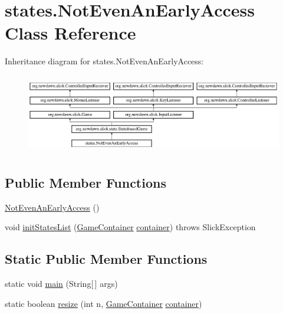 \hypertarget{classstates_1_1_not_even_an_early_access}{}\section{states.\+Not\+Even\+An\+Early\+Access Class Reference}
\label{classstates_1_1_not_even_an_early_access}
Inheritance diagram for states.\+Not\+Even\+An\+Early\+Access\+:\begin{figure}[H]
\begin{center}
\leavevmode
\includegraphics[height=3.522012cm]{classstates_1_1_not_even_an_early_access}
\end{center}
\end{figure}
\subsection*{Public Member Functions}
\begin{DoxyCompactItemize}
\item 
\mbox{\hyperlink{classstates_1_1_not_even_an_early_access_a841753f18ba88df25763818e6caa686f}{Not\+Even\+An\+Early\+Access}} ()
\item 
void \mbox{\hyperlink{classstates_1_1_not_even_an_early_access_a613e05b7f9a169410878f8d65dc0faab}{init\+States\+List}} (\mbox{\hyperlink{classorg_1_1newdawn_1_1slick_1_1_game_container}{Game\+Container}} \mbox{\hyperlink{classorg_1_1newdawn_1_1slick_1_1state_1_1_state_based_game_a538846600436175cbed48450adfdd025}{container}})  throws Slick\+Exception 
\end{DoxyCompactItemize}
\subsection*{Static Public Member Functions}
\begin{DoxyCompactItemize}
\item 
static void \mbox{\hyperlink{classstates_1_1_not_even_an_early_access_a75dcef76735edfb3b8df5724eef5f5e0}{main}} (String\mbox{[}$\,$\mbox{]} args)
\item 
static boolean \mbox{\hyperlink{classstates_1_1_not_even_an_early_access_aac2c57fc149cd71fb8326c2a9e53367d}{resize}} (int n, \mbox{\hyperlink{classorg_1_1newdawn_1_1slick_1_1_game_container}{Game\+Container}} \mbox{\hyperlink{classorg_1_1newdawn_1_1slick_1_1state_1_1_state_based_game_a538846600436175cbed48450adfdd025}{container}})
\end{DoxyCompactItemize}
